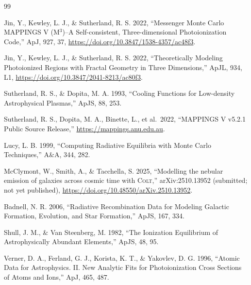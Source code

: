 \documentclass[english,a4paper]{my_memo}
\begin{document}
\begin{thebibliography}{99}

Jin, Y., Kewley, L. J., \& Sutherland, R. S. 2022,
``Messenger Monte Carlo MAPPINGS V (M$^3$)--A Self-consistent,
Three-dimensional Photoionization Code,'' ApJ, 927, 37,
\url{https://doi.org/10.3847/1538-4357/ac48f3}.

Jin, Y., Kewley, L. J., \& Sutherland, R. S. 2022,
``Theoretically Modeling Photoionized Regions with Fractal Geometry in
Three Dimensions,'' ApJL, 934, L1,
\url{https://doi.org/10.3847/2041-8213/ac80f3}.

Sutherland, R. S., \& Dopita, M. A. 1993,
``Cooling Functions for Low-density Astrophysical Plasmas,'' ApJS, 88, 253.

Sutherland, R. S., Dopita, M. A., Binette, L., et al.\ 2022,
``MAPPINGS V v5.2.1 Public Source Release,''
\url{https://mappings.anu.edu.au}.

Lucy, L. B. 1999, ``Computing Radiative Equilibria with Monte Carlo
Techniques,'' A\&A, 344, 282.

McClymont, W., Smith, A., \& Tacchella, S. 2025,
``Modelling the nebular emission of galaxies across cosmic time with
\textsc{Colt},'' arXiv:2510.13952 (submitted; not yet published),
\url{https://doi.org/10.48550/arXiv.2510.13952}.

Badnell, N. R. 2006, ``Radiative Recombination Data for Modeling Galactic
Formation, Evolution, and Star Formation,'' ApJS, 167, 334.

Shull, J. M., \& Van Steenberg, M. 1982, ``The Ionization Equilibrium of
Astrophysically Abundant Elements,'' ApJS, 48, 95.

Verner, D. A., Ferland, G. J., Korista, K. T., \& Yakovlev, D. G. 1996,
``Atomic Data for Astrophysics. II. New Analytic Fits for Photoionization
Cross Sections of Atoms and Ions,'' ApJ, 465, 487.

\end{thebibliography}
\end{document}
